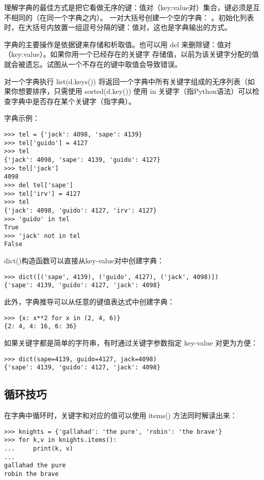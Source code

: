 \documentclass[UTF8]{ctexart}
\begin{document}
理解字典的最佳方式是把它看做无序的键：值对（key:value对）集合，键必须是互不相同的（在同一个字典之内）。
一对大括号创建一个空的字典： {} 。初始化列表时，在大括号内放置一组逗号分隔的键：值对，这也是字典输出的方式。

字典的主要操作是依据键来存储和析取值。也可以用 del 来删除键：值对（key:value）。如果你用一个已经存在的关键字
存储值，以前为该关键字分配的值就会被遗忘。试图从一个不存在的键中取值会导致错误。

对一个字典执行 list(d.keys()) 将返回一个字典中所有关键字组成的无序列表（如果你想要排序，只需使用 sorted(d.key())
使用 in 关键字（指Python语法）可以检查字典中是否存在某个关键字（指字典）。

字典示例：
\begin{verbatim}
>>> tel = {'jack': 4098, 'sape': 4139}
>>> tel['guido'] = 4127
>>> tel
{'jack': 4098, 'sape': 4139, 'guido': 4127}
>>> tel['jack']
4098
>>> del tel['sape']
>>> tel['irv'] = 4127
>>> tel
{'jack': 4098, 'guido': 4127, 'irv': 4127}
>>> 'guido' in tel
True
>>> 'jack' not in tel
False
\end{verbatim}

dict()构造函数可以直接从key-value对中创建字典：
\begin{verbatim}
>>> dict([('sape', 4139), ('guido', 4127), ('jack', 4098)])
{'sape': 4139, 'guido': 4127, 'jack': 4098}
\end{verbatim}

此外，字典推导可以从任意的键值表达式中创建字典：
\begin{verbatim}
>>> {x: x**2 for x in (2, 4, 6)}
{2: 4, 4: 16, 6: 36}
\end{verbatim}

如果关键字都是简单的字符串，有时通过关键字参数指定 key-value 对更为方便：
\begin{verbatim}
>>> dict(sape=4139, guido=4127, jack=4098)
{'sape': 4139, 'guido': 4127, 'jack': 4098}
\end{verbatim}

\subsection{循环技巧}
在字典中循环时，关键字和对应的值可以使用 items() 方法同时解读出来：
\begin{verbatim}
>>> knights = {'gallahad': 'the pure', 'robin': 'the brave'}
>>> for k,v in knights.items():
...     print(k, v)
...
gallahad the pure
robin the brave
\end{verbatim}
\end{document}
